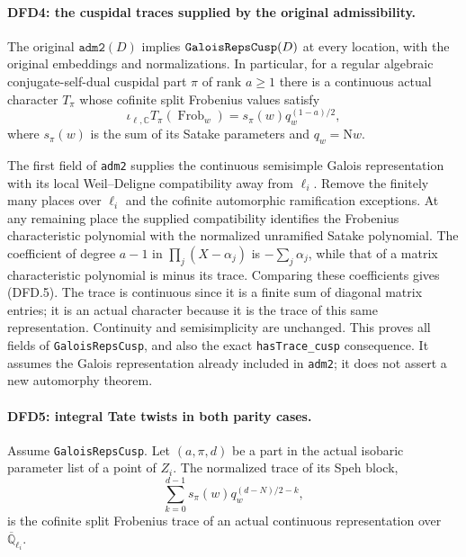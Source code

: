 \paragraph{DFD4: the cuspidal traces supplied by the original admissibility.}
\label{claim:DFD4}
The original $\texttt{adm2}(D)$ implies
$\texttt{Galois\allowbreak Reps\allowbreak Cusp}(D)$ at every location, with the
original embeddings and normalizations. In particular, for a
regular algebraic conjugate-self-dual cuspidal part $\pi$ of
rank $a\ge1$ there is a continuous actual character $T_\pi$
whose cofinite split Frobenius values satisfy
\[
 \iota_{\ell,\mathbb C}T_\pi(\operatorname{Frob}_w)
       =s_\pi(w)q_w^{(1-a)/2},                            \tag{DFD.5}
\]
where $s_\pi(w)$ is the sum of its Satake parameters and
$q_w=\mathrm Nw$.

The first field of \texttt{adm2} supplies the continuous
semisimple Galois representation with its local
Weil--Deligne compatibility away from $\ell_i$. Remove the
finitely many places over $\ell_i$ and the cofinite automorphic
ramification exceptions. At any remaining place the supplied
compatibility identifies the Frobenius characteristic
polynomial with the normalized unramified Satake polynomial.
The coefficient of degree $a-1$ in
$\prod_j(X-\alpha_j)$ is $-\sum_j\alpha_j$, while that of a
matrix characteristic polynomial is minus its trace. Comparing
these coefficients gives (DFD.5). The trace is continuous since
it is a finite sum of diagonal matrix entries; it is an actual
character because it is the trace of this same representation.
Continuity and semisimplicity are unchanged. This proves all
fields of \texttt{Galois\allowbreak Reps\allowbreak Cusp}, and also the exact
\texttt{has\allowbreak Trace\_\allowbreak cusp} consequence. It assumes the Galois
representation already included in \texttt{adm2}; it does not
assert a new automorphy theorem.

\paragraph{DFD5: integral Tate twists in both parity cases.}
\label{claim:DFD5}
Assume \texttt{Galois\allowbreak Reps\allowbreak Cusp}. Let $(a,\pi,d)$ be a part in
the actual isobaric parameter list of a point of $Z_i$. The
normalized trace of its Speh block,
\[
       \sum_{k=0}^{d-1}s_\pi(w)q_w^{(d-N)/2-k},           \tag{DFD.6}
\]
is the cofinite split Frobenius trace of an actual continuous
representation over $\overline{\mathbb Q}_{\ell_i}$.

